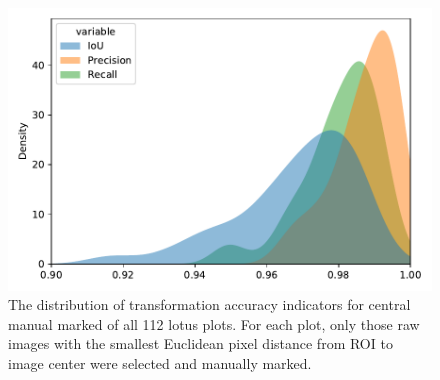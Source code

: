 \documentclass{configs/bmcart}
\begin{document}
\begin{backmatter}
\begin{figure}[!htb]
  \includegraphics[width=0.95\linewidth]{figures/iou_all.pdf}
  \caption{The distribution of transformation accuracy indicators for central manual marked of all 112 lotus plots. For each plot, only those raw images with the smallest Euclidean pixel distance from ROI to image center were selected and manually marked.}
  \label{fig:iou_all}
\end{figure}

\end{backmatter}
\end{document}
